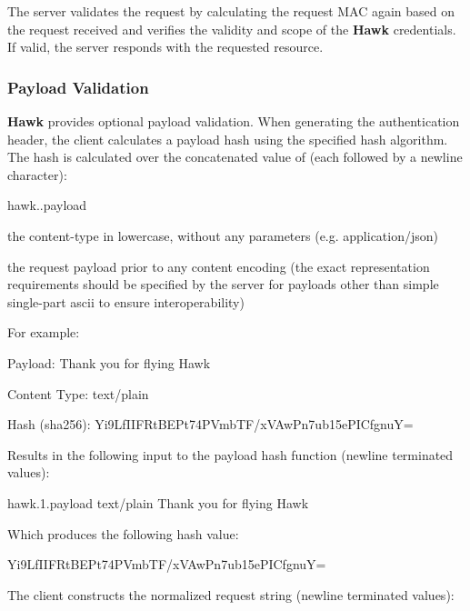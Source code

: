 The server validates the request by calculating the request M\+AC again based on the request received and verifies the validity and scope of the {\bfseries Hawk} credentials. If valid, the server responds with the requested resource.

\subsubsection*{Payload Validation}

{\bfseries Hawk} provides optional payload validation. When generating the authentication header, the client calculates a payload hash using the specified hash algorithm. The hash is calculated over the concatenated value of (each followed by a newline character)\+:
\begin{DoxyItemize}
\item {\ttfamily hawk..\+payload}
\item the content-\/type in lowercase, without any parameters (e.\+g. {\ttfamily application/json})
\item the request payload prior to any content encoding (the exact representation requirements should be specified by the server for payloads other than simple single-\/part ascii to ensure interoperability)
\end{DoxyItemize}

For example\+:


\begin{DoxyItemize}
\item Payload\+: {\ttfamily Thank you for flying Hawk}
\item Content Type\+: {\ttfamily text/plain}
\item Hash (sha256)\+: {\ttfamily Yi9\+Lf\+I\+I\+F\+Rt\+B\+E\+Pt74\+P\+Vmb\+T\+F/x\+V\+Aw\+Pn7ub15e\+P\+I\+CfgnuY=}
\end{DoxyItemize}

Results in the following input to the payload hash function (newline terminated values)\+:


\begin{DoxyCode}
hawk.1.payload
text/plain
Thank you for flying Hawk
\end{DoxyCode}


Which produces the following hash value\+:


\begin{DoxyCode}
Yi9LfIIFRtBEPt74PVmbTF/xVAwPn7ub15ePICfgnuY=
\end{DoxyCode}


The client constructs the normalized request string (newline terminated values)\+:


